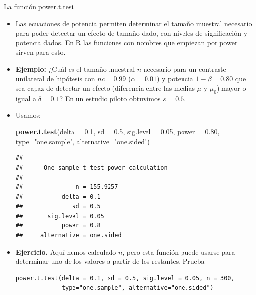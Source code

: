 \documentclass[
  9pt,
  ignorenonframetext,
]{beamer}
\newenvironment{Shaded}{\begin{snugshade}}{\end{snugshade}}
\newcommand{\DataTypeTok}[1]{\textcolor[rgb]{0.13,0.29,0.53}{#1}}
\newcommand{\FloatTok}[1]{\textcolor[rgb]{0.00,0.00,0.81}{#1}}
\newcommand{\KeywordTok}[1]{\textcolor[rgb]{0.13,0.29,0.53}{\textbf{#1}}}
\newcommand{\NormalTok}[1]{#1}
\newcommand{\StringTok}[1]{\textcolor[rgb]{0.31,0.60,0.02}{#1}}
\begin{document}
\begin{frame}[fragile]{La función power.t.test}
\protect\hypertarget{la-funcion-power.t.test}{}

\begin{itemize}
\item
  Las ecuaciones de potencia permiten determinar el tamaño muestral
  necesario para poder detectar un efecto de tamaño dado, con niveles de
  significación y potencia dados. En R las funciones con nombres que
  empiezan por power sirven para esto.
\item
  \textbf{Ejemplo:} ¿Cuál es el tamaño muestral \(n\) necesario para un
  contraste unilateral de hipótesis con \(nc = 0.99\)
  (\(\alpha = 0.01\)) y potencia \(1 - \beta = 0.80\) que sea capaz de
  detectar un efecto (diferencia entre las medias \(\mu\) y \(\mu_0\))
  mayor o igual a \(\delta = 0.1\)? En un estudio piloto obtuvimos
  \(s = 0.5\).
\item
  Usamos:\scriptsize

\begin{Shaded}
\begin{Highlighting}[]
\KeywordTok{power.t.test}\NormalTok{(}\DataTypeTok{delta =} \FloatTok{0.1}\NormalTok{, }\DataTypeTok{sd =} \FloatTok{0.5}\NormalTok{, }\DataTypeTok{sig.level =} \FloatTok{0.05}\NormalTok{,}
             \DataTypeTok{power =} \FloatTok{0.80}\NormalTok{, }\DataTypeTok{type=}\StringTok{"one.sample"}\NormalTok{, }\DataTypeTok{alternative=}\StringTok{"one.sided"}\NormalTok{)}
\end{Highlighting}
\end{Shaded}

\begin{verbatim}
## 
##      One-sample t test power calculation 
## 
##               n = 155.9257
##           delta = 0.1
##              sd = 0.5
##       sig.level = 0.05
##           power = 0.8
##     alternative = one.sided
\end{verbatim}

  \normalsize
\item
  \textbf{Ejercicio.} Aquí hemos calculado \(n\), pero esta función
  puede usarse para determinar uno de los valores a partir de los
  restantes. Prueba \scriptsize

\begin{verbatim}
power.t.test(delta = 0.1, sd = 0.5, sig.level = 0.05, n = 300, 
             type="one.sample", alternative="one.sided")
\end{verbatim}

  \normalsize
\end{itemize}

\end{frame}
\end{document}
